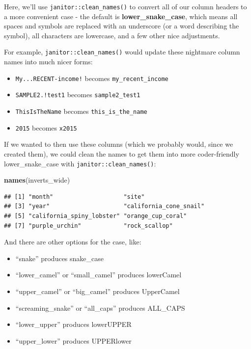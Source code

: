\documentclass[]{book}
\newenvironment{Shaded}{\begin{snugshade}}{\end{snugshade}}
\newcommand{\KeywordTok}[1]{\textcolor[rgb]{0.13,0.29,0.53}{\textbf{#1}}}
\newcommand{\NormalTok}[1]{#1}
\newcommand{\OperatorTok}[1]{\textcolor[rgb]{0.81,0.36,0.00}{\textbf{#1}}}
\newcommand{\StringTok}[1]{\textcolor[rgb]{0.31,0.60,0.02}{#1}}
\providecommand{\tightlist}{%
  \setlength{\itemsep}{0pt}\setlength{\parskip}{0pt}}
\begin{document}
Here, we'll use \texttt{janitor::clean\_names()} to convert all of our column headers to a more convenient case - the default is \textbf{lower\_snake\_case}, which means all spaces and symbols are replaced with an underscore (or a word describing the symbol), all characters are lowercase, and a few other nice adjustments.

For example, \texttt{janitor::clean\_names()} would update these nightmare column names into much nicer forms:

\begin{itemize}
\tightlist
\item
  \texttt{My...RECENT-income!} becomes \texttt{my\_recent\_income}
\item
  \texttt{SAMPLE2.!test1} becomes \texttt{sample2\_test1}
\item
  \texttt{ThisIsTheName} becomes \texttt{this\_is\_the\_name}
\item
  \texttt{2015} becomes \texttt{x2015}
\end{itemize}

If we wanted to then use these columns (which we probably would, since we created them), we could clean the names to get them into more coder-friendly lower\_snake\_case with \texttt{janitor::clean\_names()}:

\begin{Shaded}
\end{Shaded}

\begin{Shaded}
\begin{Highlighting}[]
\KeywordTok{names}\NormalTok{(inverts_wide)}
\end{Highlighting}
\end{Shaded}

\begin{verbatim}
## [1] "month"                    "site"                    
## [3] "year"                     "california_cone_snail"   
## [5] "california_spiny_lobster" "orange_cup_coral"        
## [7] "purple_urchin"            "rock_scallop"
\end{verbatim}

And there are other options for the case, like:

\begin{itemize}
\tightlist
\item
  ``snake'' produces snake\_case
\item
  ``lower\_camel'' or ``small\_camel'' produces lowerCamel
\item
  ``upper\_camel'' or ``big\_camel'' produces UpperCamel
\item
  ``screaming\_snake'' or ``all\_caps'' produces ALL\_CAPS
\item
  ``lower\_upper'' produces lowerUPPER
\item
  ``upper\_lower'' produces UPPERlower
\end{itemize}
\end{document}
